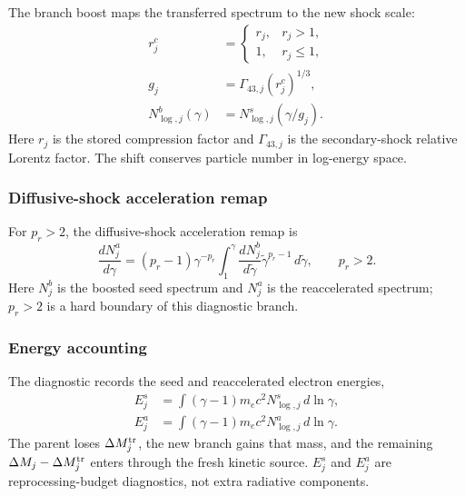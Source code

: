 \documentclass[twocolumn]{aastex702}
\begin{document}
The branch boost maps the transferred spectrum to the new shock scale:
\begin{equation}
\begin{aligned}
r_j^{c}&=
\begin{cases}
r_j, & r_j>1,\\
1, & r_j\le1,
\end{cases}\\
g_j&=\Gamma_{43,j}(r_j^{c})^{1/3},\\
N_{\log,j}^{b}(\gamma)
&=N_{\log,j}^{s}(\gamma/g_j).
\end{aligned}
\end{equation}
Here \(r_j\) is the stored compression factor and \(\Gamma_{43,j}\) is the
secondary-shock relative Lorentz factor.  The shift conserves particle number in
log-energy space.

\subsubsection{Diffusive-shock acceleration remap}

For \(p_r>2\), the diffusive-shock acceleration remap is
\begin{equation}
\frac{dN_{j}^{a}}{d\gamma}
=(p_r-1)\gamma^{-p_r}
\int_1^\gamma
\frac{dN_j^{b}}{d\tilde\gamma}
\tilde\gamma^{p_r-1}\,d\tilde\gamma,
\qquad p_r>2 .
\end{equation}
Here \(N_j^b\) is the boosted seed spectrum and \(N_j^a\) is the reaccelerated
spectrum; \(p_r>2\) is a hard boundary of this diagnostic branch.

\subsubsection{Energy accounting}

The diagnostic records the seed and reaccelerated electron energies,
\begin{equation}
\begin{aligned}
E_j^{s}&=\int(\gamma-1)m_ec^2N_{\log,j}^{s}\,d\ln\gamma,\\
E_j^{a}&=\int(\gamma-1)m_ec^2N_{\log,j}^{a}\,d\ln\gamma .
\end{aligned}
\end{equation}
The parent loses \(\Delta M_j^{\rm tr}\), the new branch gains that mass, and the
remaining \(\Delta M_j-\Delta M_j^{\rm tr}\) enters through the fresh kinetic
source.  \(E_j^s\) and \(E_j^a\) are reprocessing-budget diagnostics, not extra
radiative components.
\end{document}
